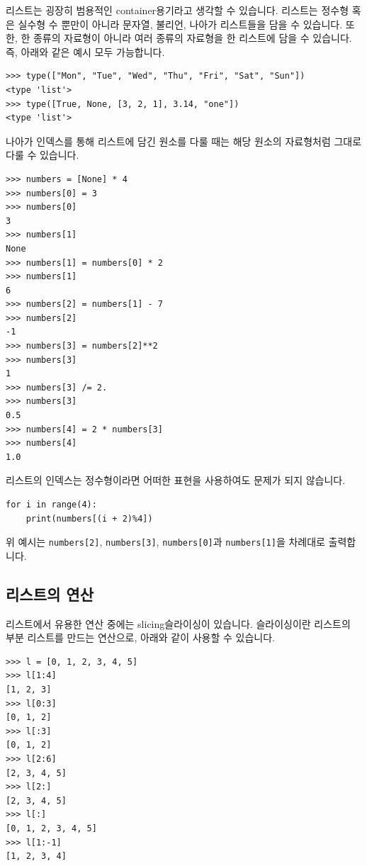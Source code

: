 \documentclass[../main.tex]{subfiles}
\begin{document}
리스트는 굉장히 범용적인 container용기라고 생각할 수 있습니다.
리스트는 정수형 혹은 실수형 수 뿐만이 아니라 문자열, 불리언, 나아가 리스트들을 담을 수 있습니다.
또한, 한 종류의 자료형이 아니라 여러 종류의 자료형을 한 리스트에 담을 수 있습니다.
즉, 아래와 같은 예시 모두 가능합니다.
\begin{verbatim}
>>> type(["Mon", "Tue", "Wed", "Thu", "Fri", "Sat", "Sun"])
<type 'list'>
>>> type([True, None, [3, 2, 1], 3.14, "one"])
<type 'list'>
\end{verbatim}
나아가 인덱스를 통해 리스트에 담긴 원소를 다룰 때는 해당 원소의 자료형처럼 그대로 다룰 수 있습니다.
\begin{verbatim}
>>> numbers = [None] * 4
>>> numbers[0] = 3
>>> numbers[0]
3
>>> numbers[1]
None
>>> numbers[1] = numbers[0] * 2
>>> numbers[1]
6
>>> numbers[2] = numbers[1] - 7
>>> numbers[2]
-1
>>> numbers[3] = numbers[2]**2
>>> numbers[3]
1
>>> numbers[3] /= 2.
>>> numbers[3]
0.5
>>> numbers[4] = 2 * numbers[3]
>>> numbers[4]
1.0
\end{verbatim}

리스트의 인덱스는 정수형이라면 어떠한 표현을 사용하여도 문제가 되지 않습니다.
\begin{verbatim}
for i in range(4):
    print(numbers[(i + 2)%4])
\end{verbatim}
위 예시는 \texttt{numbers[2]}, \texttt{numbers[3]}, \texttt{numbers[0]}과 \texttt{numbers[1]}을 차례대로 출력합니다.

\subsection{리스트의 연산}
리스트에서 유용한 연산 중에는 slicing슬라이싱이 있습니다.
슬라이싱이란 리스트의 부분 리스트를 만드는 연산으로, 아래와 같이 사용할 수 있습니다.
\begin{verbatim}
>>> l = [0, 1, 2, 3, 4, 5]
>>> l[1:4]
[1, 2, 3]
>>> l[0:3]
[0, 1, 2]
>>> l[:3]
[0, 1, 2]
>>> l[2:6]
[2, 3, 4, 5]
>>> l[2:]
[2, 3, 4, 5]
>>> l[:]
[0, 1, 2, 3, 4, 5]
>>> l[1:-1]
[1, 2, 3, 4]
\end{verbatim}
\end{document}
